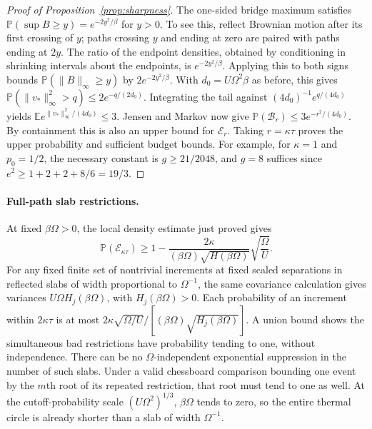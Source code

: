 \documentclass[11pt]{article}
\begin{document}
\begin{proof}[Proof of Proposition~\ref{prop:sharpness}]
The one-sided bridge maximum satisfies $\mathbb P(\sup B\ge y)=e^{-2y^2/\beta}$ for $y>0$. To see this, reflect Brownian motion after its first crossing of $y$; paths crossing $y$ and ending at zero are paired with paths ending at $2y$. The ratio of the endpoint densities, obtained by conditioning in shrinking intervals about the endpoints, is $e^{-2y^2/\beta}$. Applying this to both signs bounds $\mathbb P(\|B\|_\infty\ge y)$ by $2e^{-2y^2/\beta}$. With $d_0=U\Omega^2\beta$ as before, this gives $\mathbb P(\|v_*\|_\infty^2>q)\le2e^{-q/(2d_0)}$. Integrating the tail against $(4d_0)^{-1}e^{q/(4d_0)}$ yields $\mathbb E e^{\|v_*\|_\infty^2/(4d_0)}\le3$. Jensen and Markov now give $\mathbb P(\mathcal B_r)\le3e^{-r^2/(4d_0)}$. By containment this is also an upper bound for $\mathcal E_r$. Taking $r=\kappa\tau$ proves the upper probability and sufficient budget bounds. For example, for $\kappa=1$ and $p_0=1/2$, the necessary constant is $g\ge21/2048$, and $g=8$ suffices since $e^2\ge1+2+2+8/6=19/3$.
\end{proof}

\paragraph{Full-path slab restrictions.}
At fixed $\beta\Omega>0$, the local density estimate just proved gives
\[
 \mathbb P(\mathcal E_{\kappa\tau})
 \ge1-\frac{2\kappa}{(\beta\Omega)\sqrt{H(\beta\Omega)}}\sqrt{\frac{\Omega}{U}}.
\]
For any fixed finite set of nontrivial increments at fixed scaled separations in reflected slabs of width proportional to $\Omega^{-1}$, the same covariance calculation gives variances $U\Omega H_j(\beta\Omega)$, with $H_j(\beta\Omega)>0$. Each probability of an increment within $2\kappa\tau$ is at most $2\kappa\sqrt{\Omega/U}/[(\beta\Omega)\sqrt{H_j(\beta\Omega)}]$. A union bound shows the simultaneous bad restrictions have probability tending to one, without independence. There can be no $\Omega$-independent exponential suppression in the number of such slabs. Under a valid chessboard comparison bounding one event by the $m$th root of its repeated restriction, that root must tend to one as well. At the cutoff-probability scale $(U\Omega^2)^{1/3}$, $\beta\Omega$ tends to zero, so the entire thermal circle is already shorter than a slab of width $\Omega^{-1}$.

\newpage
\end{document}
